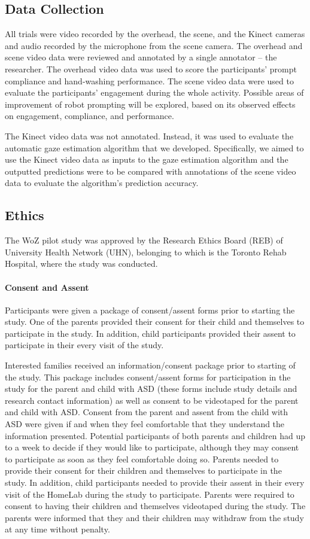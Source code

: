 \subsection{Data Collection}
All trials were video recorded by the overhead, the scene, and the Kinect cameras and audio recorded by the microphone from the scene camera.  The overhead and scene video data were reviewed and annotated by a single annotator -- the researcher. The overhead video data was used to score the participants' prompt compliance and hand-washing performance. The scene video data were used to evaluate the participants' engagement during the whole activity. Possible areas of improvement of robot prompting will be explored, based on its observed effects on engagement, compliance, and performance.

The Kinect video data was not annotated. Instead, it was used to evaluate the automatic gaze estimation algorithm that we developed. Specifically, we aimed to use the Kinect video data as inputs to the gaze estimation algorithm and the outputted predictions were to be compared with annotations of the scene video data to evaluate the algorithm's prediction accuracy.



\subsection{Ethics}
The WoZ pilot study was approved by the Research Ethics Board (REB) of University Health Network (UHN), belonging to which is the Toronto Rehab Hospital, where the study was conducted.

\paragraph{Consent and Assent}
Participants were given a package of consent/assent forms prior to starting the study. One of the parents provided their consent for their child and themselves to participate in the study. In addition, child participants provided their assent to participate in their every visit of the study. 

Interested families received an information/consent package prior to starting of the study. This package includes consent/assent forms for participation in the study for the parent and child with ASD (these forms include study details and research contact information) as well as consent to be videotaped for the parent and child with ASD. Consent from the parent and assent from the child with ASD were given if and when they feel comfortable that they understand the information presented. Potential participants of both parents and children had up to a week to decide if they would like to participate, although they may consent to participate as soon as they feel comfortable doing so. Parents needed to provide their consent for their children and themselves to participate in the study. In addition, child participants needed to provide their assent in their every visit of the HomeLab during the study to participate. Parents were required to consent to having their children and themselves videotaped during the study. The parents were informed that they and their children may withdraw from the study at any time without penalty.

